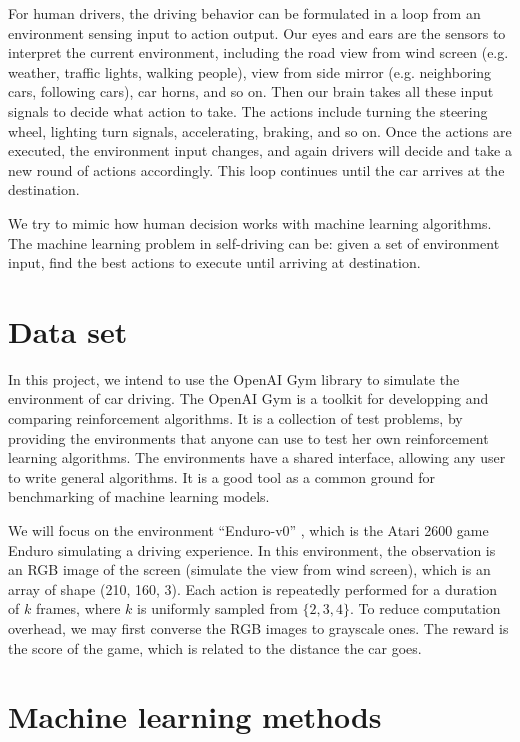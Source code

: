 \documentclass[a4paper]{article}
\begin{document}
For human drivers, the driving behavior can be formulated in a loop from an environment sensing input to action output. Our eyes and ears are the sensors to interpret the current environment, including the road view from wind screen (e.g. weather, traffic lights, walking people), view from side mirror (e.g. neighboring cars, following cars), car horns, and so on. Then our brain takes all these input signals to decide what action to take. The actions include turning the steering wheel, lighting turn signals, accelerating, braking, and so on. Once the actions are executed, the environment input changes, and again drivers will decide and take a new round of actions accordingly. This loop continues until the car arrives at the destination. 

We try to mimic how human decision works with machine learning algorithms. The machine learning problem in self-driving can be: given a set of environment input, find the best actions to execute until arriving at destination.


\section{Data set}

In this project, we intend to use the OpenAI Gym library to simulate the environment of car driving. The OpenAI Gym \cite{gym} is a toolkit for developping and comparing reinforcement algorithms. It is a collection of test problems, by providing the environments that anyone can use to test her own reinforcement learning algorithms. The environments have a shared interface, allowing any user to write general algorithms. It is a good tool as a common ground for benchmarking of machine learning models.

We will focus on the environment ``Enduro-v0'' \cite{enduro}, which is the Atari 2600 game Enduro simulating a driving experience. In this environment, the observation is an RGB image of the screen (simulate the view from wind screen), which is an array of shape (210, 160, 3). Each action is repeatedly performed for a duration of $k$ frames, where $k$ is uniformly sampled from $\{2, 3, 4\}$. To reduce computation overhead, we may first converse the RGB images to grayscale ones. The reward is the score of the game, which is related to the distance the car goes. 

\section{Machine learning methods}
\end{document}
